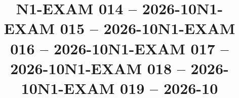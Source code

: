 \documentclass{ip-exam}
\begin{document}







\cleartoeven
\setcounter{questioncounter}{0}
\setcounter{page}{1}
\title{N1-EXAM 014 -- 2026-10}
\makeexamheader








\cleartoeven
\setcounter{questioncounter}{0}
\setcounter{page}{1}
\title{N1-EXAM 015 -- 2026-10}
\makeexamheader








\cleartoeven
\setcounter{questioncounter}{0}
\setcounter{page}{1}
\title{N1-EXAM 016 -- 2026-10}
\makeexamheader








\cleartoeven
\setcounter{questioncounter}{0}
\setcounter{page}{1}
\title{N1-EXAM 017 -- 2026-10}
\makeexamheader








\cleartoeven
\setcounter{questioncounter}{0}
\setcounter{page}{1}
\title{N1-EXAM 018 -- 2026-10}
\makeexamheader








\cleartoeven
\setcounter{questioncounter}{0}
\setcounter{page}{1}
\title{N1-EXAM 019 -- 2026-10}
\makeexamheader
\end{document}
